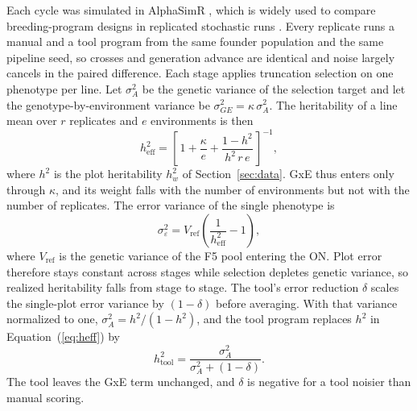 Each cycle was simulated in AlphaSimR \citep{Gaynor2020Alphasimr}, which is widely used to compare breeding-program designs in replicated stochastic runs \citep{Gorjanc2018Optimal,FritscheNeto2023Improving,Seck2024Stochastic}. Every replicate runs a manual and a tool program from the same founder population and the same pipeline seed, so crosses and generation advance are identical and noise largely cancels in the paired difference. Each stage applies truncation selection on one phenotype per line. Let $\sigma^2_A$ be the genetic variance of the selection target and let the genotype-by-environment variance be $\sigma^2_{GE} = \kappa\,\sigma^2_A$. The heritability of a line mean over $r$ replicates and $e$ environments is then
\begin{equation}
h^2_{\mathrm{eff}} = \left[\, 1 + \frac{\kappa}{e} + \frac{1-h^2}{h^2\, r\, e} \,\right]^{-1},
\label{eq:heff}
\end{equation}
where $h^2$ is the plot heritability $h^2_w$ of Section~\ref{sec:data}. GxE thus enters only through $\kappa$, and its weight falls with the number of environments but not with the number of replicates. The error variance of the single phenotype is
\begin{equation}
\sigma^2_{\varepsilon} = V_{\mathrm{ref}} \left( \frac{1}{h^2_{\mathrm{eff}}} - 1 \right),
\label{eq:vare}
\end{equation}
where $V_{\mathrm{ref}}$ is the genetic variance of the F5 pool entering the ON. Plot error therefore stays constant across stages while selection depletes genetic variance, so realized heritability falls from stage to stage. The tool's error reduction $\delta$ scales the single-plot error variance by $(1-\delta)$ before averaging. With that variance normalized to one, $\sigma^2_A = h^2/(1-h^2)$, and the tool program replaces $h^2$ in Equation~(\ref{eq:heff}) by
\begin{equation}
h^2_{\mathrm{tool}} = \frac{\sigma^2_A}{\sigma^2_A + (1-\delta)}.
\label{eq:htool}
\end{equation}
The tool leaves the GxE term unchanged, and $\delta$ is negative for a tool noisier than manual scoring.

